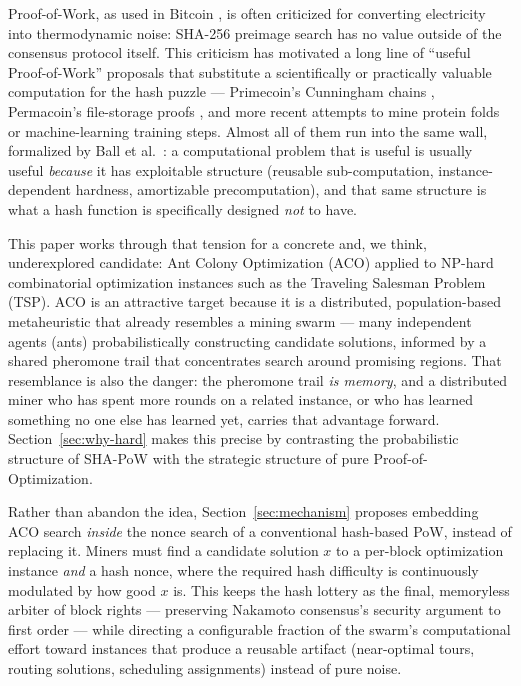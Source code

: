 \documentclass[journal]{IEEEtran}
\begin{document}
Proof-of-Work, as used in Bitcoin \cite{nakamoto2008}, is often criticized for
converting electricity into thermodynamic noise: SHA-256 preimage search has no
value outside of the consensus protocol itself. This criticism has motivated a
long line of ``useful Proof-of-Work'' proposals that substitute a
scientifically or practically valuable computation for the hash puzzle ---
Primecoin's Cunningham chains \cite{king2013primecoin}, Permacoin's file-storage
proofs \cite{miller2014permacoin}, and more recent attempts to mine protein
folds or machine-learning training steps. Almost all of them run into the same
wall, formalized by Ball et al.\ \cite{ball2017proofs}: a computational problem
that is useful is usually useful \emph{because} it has exploitable structure
(reusable sub-computation, instance-dependent hardness, amortizable
precomputation), and that same structure is what a hash function is
specifically designed \emph{not} to have.

This paper works through that tension for a concrete and, we think,
underexplored candidate: Ant Colony Optimization (ACO) \cite{dorigo2004aco}
applied to NP-hard combinatorial optimization instances such as the Traveling
Salesman Problem (TSP). ACO is an attractive target because it is a
distributed, population-based metaheuristic that already resembles a mining
swarm --- many independent agents (ants) probabilistically constructing
candidate solutions, informed by a shared pheromone trail that concentrates
search around promising regions. That resemblance is also the danger: the
pheromone trail \emph{is memory}, and a distributed miner who has spent more
rounds on a related instance, or who has learned something no one else has
learned yet, carries that advantage forward. Section~\ref{sec:why-hard} makes
this precise by contrasting the probabilistic structure of SHA-PoW with the
strategic structure of pure Proof-of-Optimization.

Rather than abandon the idea, Section~\ref{sec:mechanism} proposes embedding
ACO search \emph{inside} the nonce search of a conventional hash-based PoW,
instead of replacing it. Miners must find a candidate solution $x$ to a
per-block optimization instance \emph{and} a hash nonce, where the required
hash difficulty is continuously modulated by how good $x$ is. This keeps the
hash lottery as the final, memoryless arbiter of block rights --- preserving
Nakamoto consensus's security argument to first order --- while directing a
configurable fraction of the swarm's computational effort toward instances
that produce a reusable artifact (near-optimal tours, routing solutions,
scheduling assignments) instead of pure noise.
\end{document}
